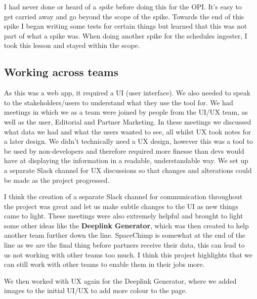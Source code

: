   \vspace{0.2cm}

  I had never done or heard of a \textit{spike} before doing this for the OPI. It's easy to get carried away and go beyond the scope of the spike.
  Towards the end of this spike I began writing some tests for certain things but learned that this was not part of what a spike was. When doing 
  another spike for the schedules ingester, I took this lesson and stayed within the scope. 

  \subsection{Working across teams}
  As this was a web app, it required a UI (user interface). We also needed to speak to the stakeholders/users to understand what they use the tool 
  for. We had meetings in which we as a team were joined by people from the UI/UX team, as well as the user, Editorial and Partner Marketing. In 
  these meetings we discussed what data we had and what the users wanted to see, all whilst UX took notes for a later design. We didn't
  technically need a UX design, however this was a tool to be used by non-developers and therefore required more finesse than devs would have at
  displaying the information in a readable, understandable way. We set up a separate Slack channel for UX discussions so that changes and 
  alterations could be made as the project progressed.


  I think the creation of a separate Slack channel for communication throughout the project was great and let us make subtle changes to the UI
  as new things came to light. These meetings were also extremely helpful and brought to light some other ideas like the 
  \textbf{Deeplink Generator}, which was then created to help another team further down the line. SpaceChimp is somewhat at the end of the line 
  as we are the final thing before partners receive their data, this can lead to us not working with other teams too much. I think this project 
  highlights that we can still work with other teams to enable them in their jobs more. 
  
  We then worked with UX again for the Deeplink Generator, where we added images to the initial UI/UX to add more colour to the page.



